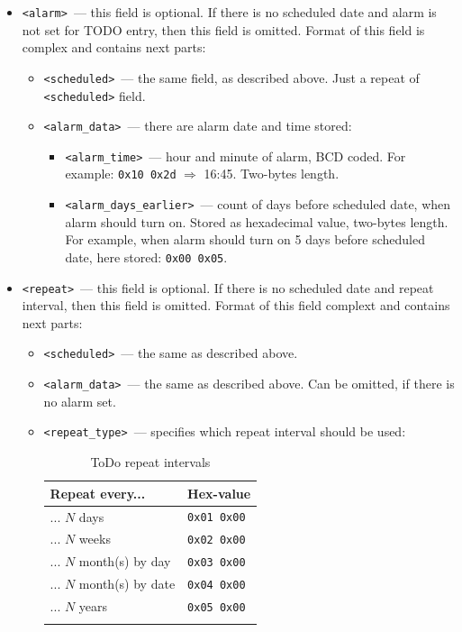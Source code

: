 \documentclass[a4paper,12pt,oneside]{scrartcl}
\begin{document}
\begin{itemize}
\item \texttt{<alarm>}~--- this field is optional. If there is no scheduled
  date and alarm is not set for TODO entry, then this field is omitted. Format
  of this field is complex and contains next parts:
  \begin{itemize}
  \item \texttt{<scheduled>}~--- the same field, as described above. Just a
    repeat of \texttt{<scheduled>} field.
  \item \texttt{<alarm\_data>}~--- there are alarm date and time stored:
    \begin{itemize}
    \item \texttt{<alarm\_time>}~--- hour and minute of alarm, BCD coded. For
      example: \texttt{0x10 0x2d} $\Rightarrow$ 16:45. Two-bytes length.
    \item \texttt{<alarm\_days\_earlier>}~--- count of days before scheduled
      date, when alarm should turn on. Stored as hexadecimal value, two-bytes
      length. For example, when alarm should turn on 5 days before scheduled
      date, here stored: \texttt{0x00 0x05}.
    \end{itemize}
  \end{itemize}

\item \texttt{<repeat>}~--- this field is optional. If there is no scheduled
  date and repeat interval, then this field is omitted. Format of this field
  complext and contains next parts:
  \begin{itemize}
  \item \texttt{<scheduled>}~--- the same as described above.
  \item \texttt{<alarm\_data>}~--- the same as described above. Can be omitted,
    if there is no alarm set.
  \item \texttt{<repeat\_type>}~--- specifies which repeat interval should be
    used:
    \begin{longtable}[H]{|l|l|}
      \hline
      \textbf{Repeat every...} & \textbf{Hex-value} \\
      \hline
      ... $N$ days & \texttt{0x01 0x00} \\
      \hline
      ... $N$ weeks & \texttt{0x02 0x00} \\
      \hline
      ... $N$ month(s) by day & \texttt{0x03 0x00} \\
      \hline
      ... $N$ month(s) by date & \texttt{0x04 0x00} \\
      \hline
      ... $N$ years & \texttt{0x05 0x00} \\
      \hline
      \caption{ToDo repeat intervals}
      \label{tab:todo-repeat-intervals}
    \end{longtable}


\end{itemize}
\end{itemize}
\end{document}
